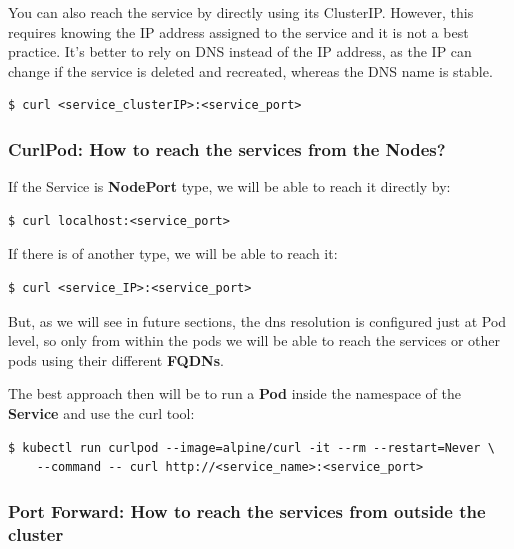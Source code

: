 \documentclass{article}
\newenvironment{codetemplate}[1][]{%
  \mybasecolorbox[#1]
  \itshape
}{%
  \endmybasecolorbox
}
\begin{document}
You can also reach the service by directly using its ClusterIP. However, this requires knowing the IP address assigned to the service and it is not a best practice. It's better to rely on DNS instead of the IP address, as the IP can change if the service is deleted and recreated, whereas the DNS name is stable.
\begin{codetemplate}{}
\begin{verbatim}
$ curl <service_clusterIP>:<service_port>
\end{verbatim}
\end{codetemplate}

\subsubsection{CurlPod: How to reach the services from the Nodes?}
If the Service is \textbf{NodePort} type, we will be able to reach it directly by:
\begin{codetemplate}{}
\begin{verbatim}
$ curl localhost:<service_port>
\end{verbatim}
\end{codetemplate}

If there is of another type, we will be able to reach it:
\begin{codetemplate}{}
\begin{verbatim}
$ curl <service_IP>:<service_port>
\end{verbatim}
\end{codetemplate}

But, as we will see in future sections, the dns resolution is configured just at Pod level, so only from within the pods we will be able to reach
the services or other pods using their different \textbf{FQDNs}.

The best approach then will be to run a \textbf{Pod} inside the namespace of the \textbf{Service} and use the curl tool:

\begin{codetemplate}{}
\begin{verbatim}
$ kubectl run curlpod --image=alpine/curl -it --rm --restart=Never \
    --command -- curl http://<service_name>:<service_port>
\end{verbatim}
\end{codetemplate}

\subsubsection{Port Forward: How to reach the services from outside the cluster}
\end{document}
